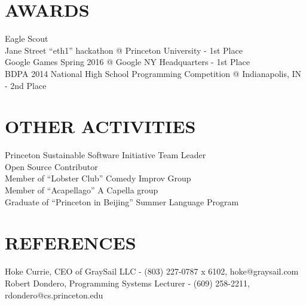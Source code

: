 \documentclass[margin]{res}
\begin{document}
\begin{resume}
\section{AWARDS}
            Eagle Scout \\
            Jane Street ``eth1'' hackathon @ Princeton University - 1st Place \\
            Google Games Spring 2016 @ Google NY Headquarters - 1st Place \\
            BDPA 2014 National High School Programming Competition @ Indianapolis, IN - 2nd Place
 
\section{OTHER ACTIVITIES}
            Princeton Sustainable Software Initiative Team Leader \\
            Open Source Contributor \\
            Member of ``Lobster Club'' Comedy Improv Group\\
            Member of ``Acapellago'' A Capella group\\
            Graduate of ``Princeton in Beijing'' Summer Language Program

\section{REFERENCES}
            Hoke Currie, CEO of GraySail LLC - (803) 227-0787 x 6102, hoke@graysail.com \\
            Robert Dondero, Programming Systems Lecturer - (609) 258-2211, rdondero@cs.princeton.edu
 

 
\end{resume} 
\end{document}
